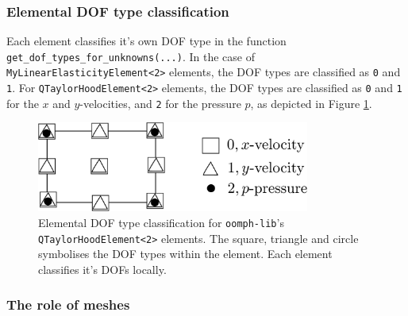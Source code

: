\subsubsection{Elemental DOF type classification}

Each element classifies it's own DOF type in the function 
\texttt{get\_\allowbreak dof\_\allowbreak types\_\allowbreak for\_\allowbreak unknowns(...)}. In the case of 
\texttt{My\allowbreak Linear\allowbreak Elasticity\allowbreak Element<2>} elements, the DOF types are classified as 
\texttt{0} and \texttt{1}. For \texttt{Q\allowbreak TaylorHood\allowbreak Element<2>} 
elements, the DOF types are classified as \texttt{0} and \texttt{1} for the $x$
and $y$-velocities, and \texttt{2} for the pressure $p$, as depicted in Figure \ref{fig:2DTH_DOF_classification}.
\begin{figure}[H]
\centering
\includegraphics[width=0.8\textwidth]{./pic/taylorhood_dof_classification.pdf}
\caption{Elemental DOF type classification for \texttt{oomph-\allowbreak lib}'s
  \texttt{Q\allowbreak TaylorHood\allowbreak Element<2>} elements. The square,
  triangle and circle symbolises the DOF types within the element. Each element
  classifies it's DOFs locally.}
\label{fig:2DTH_DOF_classification}
\end{figure}

\subsubsection{The role of meshes}

